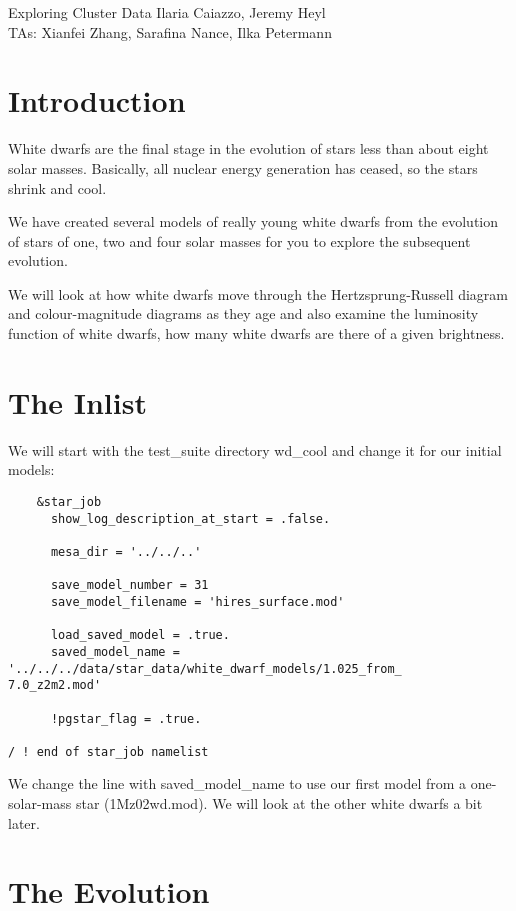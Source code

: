 \documentclass{article}
\begin{document}
\begin{titlebox}{Exploring Cluster Data}
Ilaria Caiazzo, Jeremy Heyl \\
TAs: Xianfei Zhang, Sarafina Nance, Ilka Petermann
\end{titlebox}

\section{Introduction}

White dwarfs are the final stage in the evolution of stars less than about eight solar masses.  Basically, all nuclear energy generation has ceased, so the stars shrink and cool.  

We have created several models of really young white dwarfs from the evolution of stars of one, two and four solar masses for you to explore the subsequent evolution.

We will look at how white dwarfs move through the Hertzsprung-Russell diagram and colour-magnitude diagrams as they age and also examine the luminosity function of white dwarfs, how many white dwarfs are there of a given brightness.

\section{The Inlist}

We will start with the test\_suite directory wd\_cool and change it for our initial models: 
\begin{verbatim}
    &star_job
      show_log_description_at_start = .false.

      mesa_dir = '../../..'

      save_model_number = 31
      save_model_filename = 'hires_surface.mod'

      load_saved_model = .true.
      saved_model_name = '../../../data/star_data/white_dwarf_models/1.025_from_
7.0_z2m2.mod'

      !pgstar_flag = .true.

/ ! end of star_job namelist
\end{verbatim}
We change the line with saved\_model\_name to use our first model from a one-solar-mass star (1Mz02wd.mod).  We will look at the other white dwarfs a bit later.

\section{The Evolution}
\end{document}
